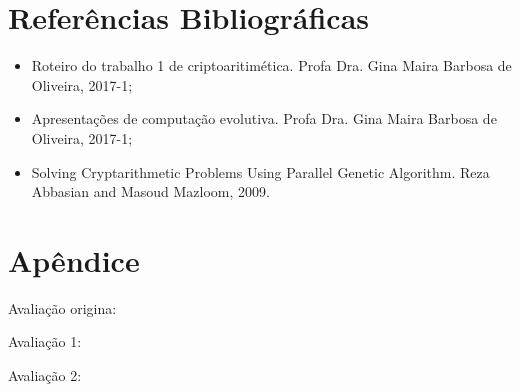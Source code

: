 \documentclass[a4paper, 12pt]{article}
\begin{document}
\section{Referências Bibliográficas}
  \begin{itemize}
    \item Roteiro do trabalho 1 de criptoaritimética. Profa Dra. Gina Maira Barbosa de Oliveira, 2017-1;
    \item Apresentações de computação evolutiva. Profa Dra. Gina Maira Barbosa de Oliveira, 2017-1;
    \item Solving Cryptarithmetic Problems Using Parallel Genetic Algorithm. Reza Abbasian and Masoud Mazloom, 2009.
  \end{itemize}



\section{Apêndice}
  Avaliação origina:
  

  Avaliação 1:
  

  Avaliação 2:
  
\end{document}
